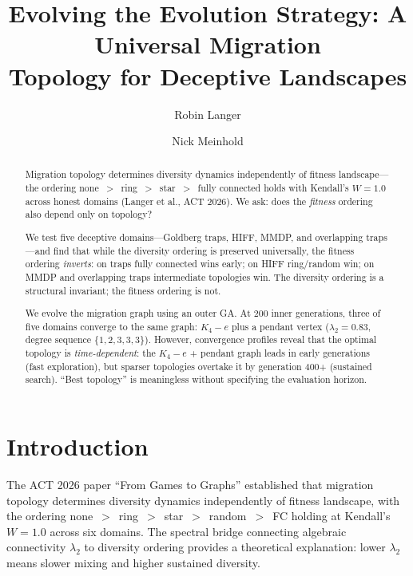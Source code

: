 \documentclass[sigconf,nonacm]{acmart}
\title{Evolving the Evolution Strategy: A Universal Migration\\
       Topology for Deceptive Landscapes}
\author{Robin Langer}
\affiliation{\institution{Universit\'{e} Paris-Est Marne-la-Vall\'{e}e}}
\author{Nick Meinhold}
\affiliation{\institution{Independent Researcher}}
\begin{document}
\maketitle


\begin{abstract}
Migration topology determines diversity dynamics independently of
fitness landscape---the ordering
none~$>$~ring~$>$~star~$>$~fully connected holds with
Kendall's $W = 1.0$ across honest domains (Langer et al., ACT 2026).
We ask: does the \emph{fitness} ordering also depend only on topology?

We test five deceptive domains---Goldberg traps, HIFF, MMDP, and
overlapping traps---and find that while the diversity ordering is
preserved universally, the fitness ordering \emph{inverts}: on traps
fully connected wins early; on HIFF ring/random win; on MMDP and
overlapping traps intermediate topologies win. The diversity ordering
is a structural invariant; the fitness ordering is not.

We evolve the migration graph using an outer GA. At 200 inner
generations, three of five domains converge to the same graph:
$K_4 - e$ plus a pendant vertex ($\lambda_2 = 0.83$, degree
sequence $\{1,2,3,3,3\}$). However, convergence profiles reveal
that the optimal topology is \emph{time-dependent}: the $K_4 - e$
+ pendant graph leads in early generations (fast exploration), but
sparser topologies overtake it by generation 400+ (sustained
search). ``Best topology'' is meaningless without specifying the
evaluation horizon.
\end{abstract}


\section{Introduction}
\label{sec:intro}

The ACT 2026 paper ``From Games to Graphs'' established that migration
topology determines diversity dynamics independently of fitness
landscape, with the ordering none~$>$~ring~$>$~star~$>$~random~$>$~FC
holding at Kendall's $W = 1.0$ across six domains. The spectral bridge
connecting algebraic connectivity $\lambda_2$ to diversity ordering
provides a theoretical explanation: lower $\lambda_2$ means slower
mixing and higher sustained diversity.
\end{document}
